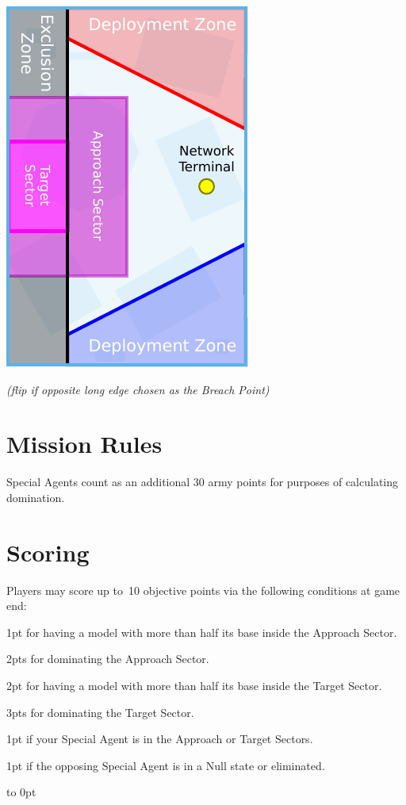 \begin{minipage}[t]{2in}\centering
\vspace{4pt}   
\includegraphics{maps/map-breachpoint}

\medskip\small%
\emph{(flip if opposite long edge chosen as the Breach Point)}
\end{minipage}

\section{Mission Rules}

Special Agents count as an additional 30 army points for purposes of
calculating domination.

\section{Scoring}

Players may score up to~10 objective points via the following
conditions at game end:
\begin{squishitemize}
\item 1pt for having a model with more than half its base inside the
  Approach Sector.
\item 2pts for dominating the Approach Sector.
\item 2pt for having a model with more than half its base inside the
  Target Sector.
\item 3pts for dominating the Target Sector.
\item 1pt if your Special Agent is in the Approach or Target Sectors.
\item 1pt if the opposing Special Agent is in a Null state or eliminated.
\end{squishitemize}

\vfill
\vbox to 0pt{}